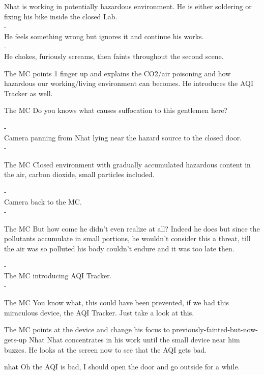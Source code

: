 \documentclass{screenplay}
\begin{document}


Nhat is working in potentially hazardous environment. He is either soldering or fixing his bike inside the closed Lab. 
\\-\\
He feels something wrong but ignores it and continue his works.
\\-\\
He chokes, furiously screams, then faints throughout the second scene.
\newline
\newline
\newline
\newline
\newline
{}

The MC points 1 finger up and explains the CO2/air poisoning and how hazardous our working/living environment can becomes. He introduces the AQI Tracker as well.

\begin{dialogue}{The MC}
Do you knows what causes suffocation to this gentlemen here?
\end{dialogue}
-\\
Camera panning from Nhat lying near the hazard source to the closed door.
\\-\\
\begin{dialogue}{The MC}
Closed environment with gradually accumulated hazardous content in the air, carbon dioxide, small particles included.
\end{dialogue}
-\\
Camera back to the MC.
\\-\\
\begin{dialogue}{The MC}
But how come he didn't even realize at all? Indeed he does but since the pollutants accumulate in small portions, he wouldn't consider this a threat, till the air was so polluted his body couldn't endure and it was too late then.
\end{dialogue}
-\\
The MC introducing AQI Tracker.
\\-\\ 
\begin{dialogue}{The MC}
You know what, this could have been prevented, if we had this miraculous device, the AQI Tracker. Just take a look at this.
\end{dialogue}
The MC points at the device and change his focus to previously-fainted-but-now-gets-up Nhat 
\newline
\newline
\newline
\newline
\newline
{}
Nhat concentrates in his work until the small device near him buzzes.
He looks at the screen now to see that the AQI gets bad.
\begin{dialogue}{nhat}
Oh the AQI is bad, I should open the door and go outside for a while.
\end{dialogue}
\end{document}
